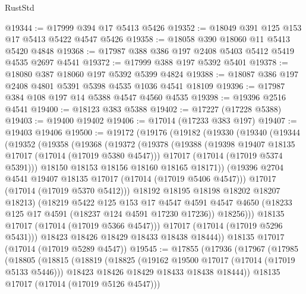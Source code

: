 \begin{lexlean}{RustStd}
\begin{coremodule}
{\begin{coremodule}
{{{{{{{{{{{{{{{{{{{{{{{{{{{{{{{{{{{{{{{{{{{{{{{{{{{{{{{@19344 := @17999 @394 @17 @5413 @5426
@19352 := @18049 @391 @125 @153 @17 @5413 @5422 @4547 @5426
@19358 := @18058 @390 @18060 @11 @5413 @5420 @4848
@19368 := @17987 @388 @386 @197 @2408 @5403 @5412 @5419 @4535 @2697 @4541
@19372 := @17999 @388 @197 @5392 @5401
@19378 := @18080 @387 @18060 @197 @5392 @5399 @4824
@19388 := @18087 @386 @197 @2408 @4801 @5391 @5398 @4535 @1036 @4541 @18109
@19396 := @17987 @384 @108 @197 @14 @5388 @4547 @4560 @4535
@19398 := @19396 @2516 @4541
@19400 := @18123 @383 @5388
@19402 := @17227 (@17228 @5388)
@19403 := @19400 @19402
@19406 := @17014 (@17233 @383 @197)
@19407 := @19403 @19406
@19500 := @19172
    (@19176
      (@19182
        (@19330
          (@19340
            (@19344
              (@19352
                (@19358
                  (@19368
                    (@19372
                      (@19378
                        (@19388
                          (@19398 @19407 @18135 @17017 (@17014 (@17019 @5380 @4547)))
                          @17017
                          (@17014 (@17019 @5374 @5391)))
                        @18150
                        @18153
                        @18156
                        @18160
                        @18165
                        @18171))
                    (@19396 @2704 @4541 @19407 @18135 @17017 (@17014 (@17019 @5406 @4547)))
                    @17017
                    (@17014 (@17019 @5370 @5412)))
                  @18192
                  @18195
                  @18198
                  @18202
                  @18207
                  @18213)
                (@18219
                  @5422
                  @125
                  @153
                  @17
                  @4547
                  @4591
                  @4547
                  @4650
                  (@18233 @125 @17 @4591 (@18237 @124 @4591 @17230 @17236))
                  @18256)))
            @18135
            @17017
            (@17014 (@17019 @5366 @4547)))
          @17017
          (@17014 (@17019 @5296 @5431)))
        @18423
        @18426
        @18429
        @18433
        @18438
        @18444))
    @18135
    @17017
    (@17014 (@17019 @5289 @4547))
@19545 := @17855
    (@17936
      (@17967
        (@17985
          (@18805
            (@18815
              (@18819
                (@18825
                  (@19162 @19500 @17017 (@17014 (@17019 @5133 @5446)))
                  @18423
                  @18426
                  @18429
                  @18433
                  @18438
                  @18444))
              @18135
              @17017
              (@17014 (@17019 @5126 @4547)))
}}}}}}}}}}}}}}}}}}}}}}}}}}}}}}}}}}}}}}}}}}}}}}}}}}}}}}}
\end{coremodule}}
\end{coremodule}
\end{lexlean}
